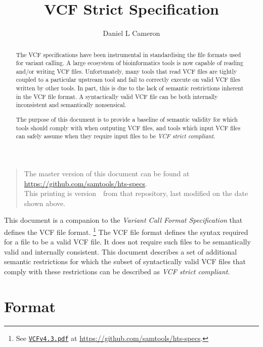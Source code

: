 \documentclass[10pt]{article}
\begin{document}

\title{VCF Strict Specification}
\author{Daniel L Cameron}
\date{\headdate}
\maketitle
\begin{quote}\small
The master version of this document can be found at
\url{https://github.com/samtools/hts-specs}.\\
This printing is version~\commitdesc\ from that repository,
last modified on the date shown above.
\end{quote}
\vspace*{1em}

\noindent
This document is a companion to the {\sl Variant Call Format Specification} that defines the VCF file format.
\footnote{See \href{http://samtools.github.io/hts-specs/VCFv4.3.pdf}{\tt VCFv4.3.pdf} at \url{https://github.com/samtools/hts-specs}.}
The VCF file format defines the syntax required for a file to be a valid VCF file.
It does not require such files to be semantically valid and internally consistent.
This document describes a set of additional semantic restrictions for which the subset of syntactically valid VCF files that comply with these restrictions can be described as \textit{VCF strict compliant}.

\renewcommand{\abstractname}{Introduction}
\begin{abstract}

The VCF specifications have been instrumental in standardising the file formats used for variant calling.
A large ecosystem of bioinformatics tools is now capable of reading and/or writing VCF files.
Unfortunately, many tools that read VCF files are tightly coupled to a particular upstream tool  and fail to correctly execute on valid VCF files written by other tools.
In part, this is due to the lack of semantic restrictions inherent in the VCF file format.
A syntactically valid VCF file can be both internally inconsistent and semantically nonsensical.

The purpose of this document is to provide a baseline of semantic validity for which tools should comply with when outputing VCF files, and tools which input VCF files can safely assume when they require input files to be \textit{VCF strict compliant}.

\end{abstract}

\section{Format}
\end{document}
